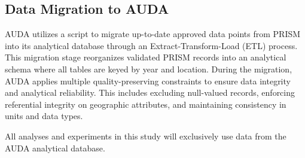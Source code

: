 \subsection{Data Migration to AUDA}

AUDA utilizes a script to migrate up-to-date approved data points from PRISM into its analytical database through an Extract-Transform-Load (ETL) process. This migration stage reorganizes validated PRISM records into an analytical schema where all tables are keyed by year and location. During the migration, AUDA applies multiple quality-preserving constraints to ensure data integrity and analytical reliability. This includes excluding null-valued records, enforcing referential integrity on geographic attributes, and maintaining consistency in units and data types.

All analyses and experiments in this study will exclusively use data from the AUDA analytical database.
